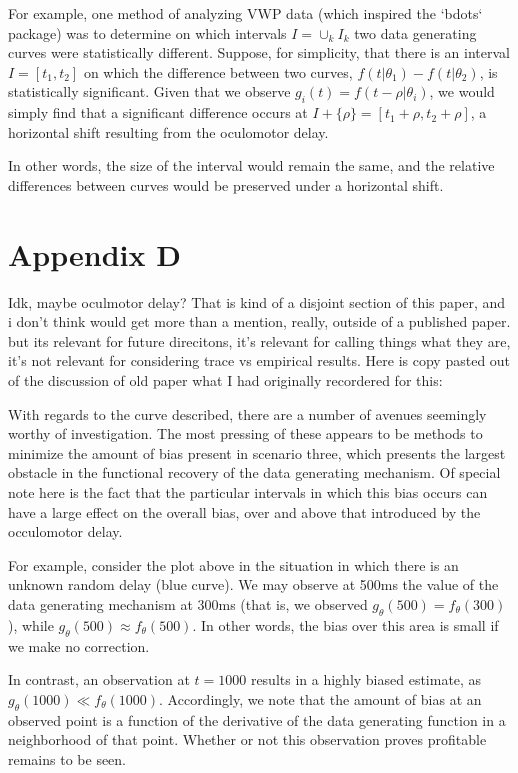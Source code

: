 \documentclass{article}
\begin{document}
For example, one method of analyzing VWP data (which inspired the `bdots` package) was to determine on which intervals $I = \cup_{k} I_k$ two data generating curves were statistically different. Suppose, for simplicity, that there is an interval $I = [t_1, t_2]$ on which the difference between two curves, $f(t | \theta_1) - f(t|\theta_2)$, is statistically significant. Given that we observe $g_i(t) = f(t - \rho | \theta_i)$, we would simply find that a significant difference occurs at $I + \{\rho\} = [t_1 + \rho, t_2 + \rho]$, a horizontal shift resulting from the oculomotor delay.

In other words, the size of the interval would remain the same, and the relative differences between curves would be preserved under a horizontal shift. 

\section*{Appendix D}

Idk, maybe oculmotor delay? That is kind of a disjoint section of this paper, and i don't think would get more than a mention, really, outside of a published paper. but its relevant for future direcitons, it's relevant for calling things what they are, it's not relevant for considering trace vs empirical results. Here is copy pasted out of the discussion of old paper what I had originally recordered for this:

With regards to the curve described, there are a number of avenues seemingly worthy of investigation. The most pressing of these appears to be methods to minimize the amount of bias present in scenario three, which presents the largest obstacle in the functional recovery of the data generating mechanism. Of special note here is the fact that the particular intervals in which this bias occurs can have a large effect on the overall bias, over and above that introduced by the occulomotor delay. 

For example, consider the plot above in the situation in which there is an unknown random delay (blue curve). We may observe at 500ms the value of the data generating mechanism at 300ms (that is, we observed $g_{\theta}(500) = f_{\theta}(300)$), while $g_{\theta}(500) \approx f_{\theta}(500)$. In other words, the bias over this area is small if we make no correction.

In contrast, an observation at $t = 1000$ results in a highly biased estimate, as $g_{\theta}(1000) \ll f_{\theta}(1000)$. Accordingly, we note that the amount of bias at an observed point is a function of the derivative of the data generating function in a neighborhood of that point. Whether or not this observation proves profitable remains to be seen.
\end{document}
